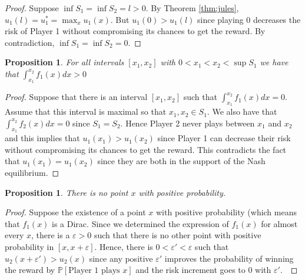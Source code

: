 \documentclass[preprint,12pt,authoryear,doubleblind]{elsarticle}
\newtheorem{proposition}[theorem]{Proposition}
\theoremstyle{definition}
\begin{document}
\begin{proof}
Suppose $\inf S_1 = \inf S_2 = l > 0$. By Theorem \ref{thm:jules}, $u_1(l) = u_1^* = \max_x u_1(x)$. But $u_1(0) > u_1(l)$ since playing $0$ decreases the risk of Player 1 without compromising its chances to get the reward. By contradiction, $\inf S_1 = \inf S_2 = 0$.
 \end{proof}
\begin{proposition}
For all intervals $[x_1, x_2]$ with $0 < x_1 < x_2 < \sup S_1$ we have that $\int_{x_1}^{x_2} f_1(x) dx > 0$
 \end{proposition}
\begin{proof}
    
 Suppose that there is an interval $[x_1, x_2]$ such that $\int_{x_1}^{x_2} f_1(x) dx =0$. Assume that this interval is maximal so that $x_1, x_2 \in S_1$. We also have that $\int_{x_1}^{x_2} f_2(x) dx = 0$ since $S_1 = S_2$. Hence Player 2 never plays between $x_1$ and $x_2$ and this implies that $u_1(x_1) > u_1(x_2)$ since Player 1 can decrease their risk without compromising its chances to get the reward. This contradicts the fact that $u_1(x_1) = u_1(x_2)$ since they are both in the support of the Nash equilibrium.
\end{proof}
\begin{proposition}
There is no point $x$ with positive probability.
\end{proposition}
\begin{proof}
 Suppose the existence of a point $x$ with positive probability (which means that $f_1(x)$ is a Dirac. Since we determined the expression of $f_1(x)$ for almost every $x$, there is a $\varepsilon > 0$ such that there is no other point with positive probability in $[x, x+\varepsilon]$. Hence, there is $0 < \varepsilon' < \varepsilon$ such that $u_2(x + \varepsilon') > u_2(x)$ since any positive $\varepsilon'$ improves the probability of winning the reward by $\mathbb{P}[\text{Player 1 plays } x]$ and the risk increment goes to $0$ with $\varepsilon'$.\
\end{proof}

\nashcor*
\end{document}
